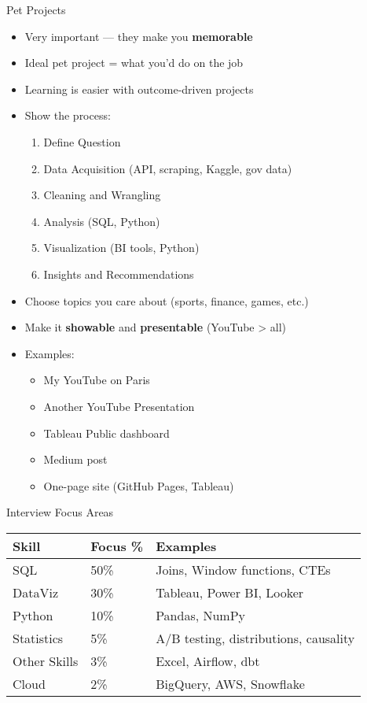 \documentclass[10pt,a4paper]{article}
\begin{document}
\begin{multicols}{3}
\begin{textboxRed}{Pet Projects}
\begin{itemize}
    \item Very important — they make you \textbf{memorable}
    \item Ideal pet project = what you'd do on the job
    \item Learning is easier with outcome-driven projects
    \item Show the process:
    \begin{enumerate}
        \item Define Question
        \item Data Acquisition (API, scraping, Kaggle, gov data)
        \item Cleaning and Wrangling
        \item Analysis (SQL, Python)
        \item Visualization (BI tools, Python)
        \item Insights and Recommendations
    \end{enumerate}
    \item Choose topics you care about (sports, finance, games, etc.)
    \item Make it \textbf{showable} and \textbf{presentable} (YouTube > all)
    \item Examples:
    \begin{itemize}
        \item My YouTube on Paris
        \item Another YouTube Presentation
        \item Tableau Public dashboard
        \item Medium post
        \item One-page site (GitHub Pages, Tableau)
    \end{itemize}
\end{itemize}
\end{textboxRed}

\begin{textbox}{Interview Focus Areas}
\begin{tabular}{l|l|l}
\textbf{Skill} & \textbf{Focus \%} & \textbf{Examples} \\
\hline
SQL & 50\% & Joins, Window functions, CTEs \\
DataViz & 30\% & Tableau, Power BI, Looker \\
Python & 10\% & Pandas, NumPy \\
Statistics & 5\% & A/B testing, distributions, causality \\
Other Skills & 3\% & Excel, Airflow, dbt \\
Cloud & 2\% & BigQuery, AWS, Snowflake \\
\end{tabular}
\end{textbox}


\end{multicols}
\end{document}
